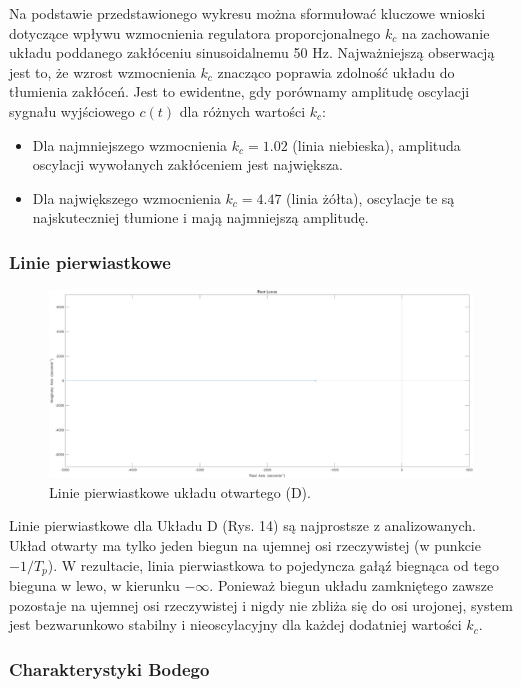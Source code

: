 \documentclass[12pt,a4paper]{article}
\begin{document}
	Na podstawie przedstawionego wykresu można sformułować kluczowe wnioski dotyczące wpływu wzmocnienia regulatora proporcjonalnego $k_c$ na zachowanie układu poddanego zakłóceniu sinusoidalnemu 50 Hz. Najważniejszą obserwacją jest to, że wzrost wzmocnienia $k_c$ znacząco poprawia zdolność układu do tłumienia zakłóceń. Jest to ewidentne, gdy porównamy amplitudę oscylacji sygnału wyjściowego $c(t)$ dla różnych wartości $k_c$: 
	
	\begin{itemize}
		\item Dla najmniejszego wzmocnienia $k_c = 1.02$ (linia niebieska), amplituda oscylacji wywołanych zakłóceniem jest największa.
		\item Dla największego wzmocnienia $k_c = 4.47$ (linia żółta), oscylacje te są najskuteczniej tłumione i mają najmniejszą amplitudę.
	\end{itemize}
		
	
	\subsubsection{Linie pierwiastkowe}
	
	\begin{figure}[H]
		\centering
		\includegraphics[width=0.8\linewidth]{zdjecia/LP_ukladD.png}
		\caption{Linie pierwiastkowe układu otwartego (D).}
		\label{fig:LP_ukladD}
	\end{figure}
	
	Linie pierwiastkowe dla Układu D (Rys. 14) są najprostsze z analizowanych. Układ otwarty ma tylko jeden biegun na ujemnej osi rzeczywistej (w punkcie $-1/T_p$). W rezultacie, linia pierwiastkowa to pojedyncza gałąź biegnąca od tego bieguna w lewo, w kierunku $-\infty$. Ponieważ biegun układu zamkniętego zawsze pozostaje na ujemnej osi rzeczywistej i nigdy nie zbliża się do osi urojonej, system jest bezwarunkowo stabilny i nieoscylacyjny dla każdej dodatniej wartości $k_c$.
	
	\subsubsection{Charakterystyki Bodego}
	
\end{document}

